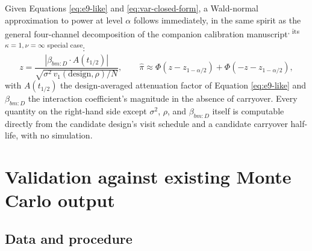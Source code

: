 \documentclass[
  11pt,
]{article}
\begin{document}
Given Equations \eqref{eq:e9-like} and \eqref{eq:var-closed-form}, a
Wald-normal approximation to power at level \(\alpha\) follows
immediately, in the same spirit as the general four-channel
decomposition of the companion calibration manuscript\textsuperscript{, its \(\kappa=1,\nu=\infty\) special case}:
\begin{equation}
z = \frac{|\beta_{bm:D}\cdot A(t_{1/2})|}
  {\sqrt{\sigma^2\, v_1(\mathrm{design},\rho)/N}}, \qquad
  \hat\pi \approx \Phi(z - z_{1-\alpha/2}) + \Phi(-z - z_{1-\alpha/2}),
\label{eq:power-closed-form}
\end{equation}
with \(A(t_{1/2})\) the design-averaged attenuation factor of
Equation \eqref{eq:e9-like} and \(\beta_{bm:D}\) the interaction
coefficient's magnitude in the absence of carryover. Every quantity
on the right-hand side except \(\sigma^2\), \(\rho\), and \(\beta_{bm:D}\)
itself is computable directly from the candidate design's visit
schedule and a candidate carryover half-life, with no simulation.

\section{Validation against existing Monte Carlo output}\label{validation-against-existing-monte-carlo-output}

\subsection{Data and procedure}\label{data-and-procedure}
\end{document}
